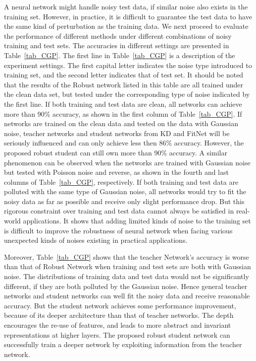 \documentclass[journal]{IEEEtran}
\newcommand{\Tref}[1]{Table~\ref{#1}}
\begin{document}
A neural network might handle noisy test data, if similar noise also exists in the training set. However, in practice, it is difficult to guarantee the test data to have the same kind of perturbation as the training data. We next proceed to evaluate the performance of different methods under different combinations of noisy training and test sets. The accuracies in different settings are presented in \Tref{tab_CGP}. The first line in \Tref{tab_CGP} is a description of the experiment settings. The first capital letter indicates the noise type introduced to training set, and the second letter indicates that of test set. It should be noted that the results of the Robust network listed in this table are all trained under the clean data set, but tested under the corresponding type of noise indicated by the first line. If both training and test data are clean, all networks can achieve more than 90\% accuracy, as shown in the first column of \Tref{tab_CGP}. If networks are trained on the clean data and tested on the data with Gaussian noise, teacher networks and student networks from KD and FitNet will be seriously influenced and can only achieve less then 86\% accuracy. However, the proposed robust student can still own more than 90\% accuracy. A similar phenomenon can be observed when the networks are trained with Gaussian noise but tested with Poisson noise and reverse, as shown in the fourth and last columns of \Tref{tab_CGP}, respectively. If both training and test data are polluted with the same type of Gaussian noise, all networks would try to fit the noisy data as far as possible and receive only slight performance drop. But this rigorous constraint over training and test data cannot always be satisfied in real-world applications. It shows that adding limited kinds of noise to the training set is difficult to improve the robustness of neural network when facing various unexpected kinds of noises existing in practical applications. 



Moreover, \Tref{tab_CGP} shows that the teacher Network's accuracy is worse than that of Robust Network when training and test sets are both with Gaussian noise. The distributions of training data and test data would not be significantly different, if they are both polluted by the Gaussian noise. Hence general teacher networks and student networks can well fit the noisy data and receive reasonable accuracy. But the student network achieves some performance improvement, because of its deeper architecture than that of teacher networks. The depth encourages the re-use of features, and leads to more abstract and invariant representations at higher layers. The proposed robust student network can successfully train a deeper network by exploiting information from the teacher network.
\end{document}
